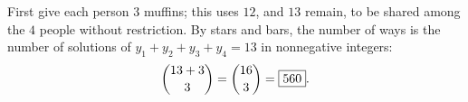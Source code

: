 First give each person $3$ muffins; this uses $12$, and $13$ remain, to be shared among the $4$ people without restriction. By stars and bars, the number of ways is the number of solutions of $y_1+y_2+y_3+y_4=13$ in nonnegative integers:
\[\dbinom{13+3}{3}=\dbinom{16}{3}=\boxed{560}.\]
